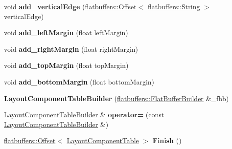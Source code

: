 \begin{DoxyCompactItemize}
\item 
\mbox{\label{structflatbuffers_1_1LayoutComponentTableBuilder_aa7a709b341f4b4b62d538a2db9bcde43}} 
void {\bfseries add\+\_\+vertical\+Edge} (\hyperlink{structflatbuffers_1_1Offset}{flatbuffers\+::\+Offset}$<$ \hyperlink{structflatbuffers_1_1String}{flatbuffers\+::\+String} $>$ vertical\+Edge)
\item 
\mbox{\label{structflatbuffers_1_1LayoutComponentTableBuilder_a2d6a674e3edb4f2c7b7a426f628aaeff}} 
void {\bfseries add\+\_\+left\+Margin} (float left\+Margin)
\item 
\mbox{\label{structflatbuffers_1_1LayoutComponentTableBuilder_a62758a856c7dd7093684ffbcec7f7d15}} 
void {\bfseries add\+\_\+right\+Margin} (float right\+Margin)
\item 
\mbox{\label{structflatbuffers_1_1LayoutComponentTableBuilder_afde69f207294bf7b0b4097c6f31f0304}} 
void {\bfseries add\+\_\+top\+Margin} (float top\+Margin)
\item 
\mbox{\label{structflatbuffers_1_1LayoutComponentTableBuilder_a68f4715e0f01f6d6e89542fece156944}} 
void {\bfseries add\+\_\+bottom\+Margin} (float bottom\+Margin)
\item 
\mbox{\label{structflatbuffers_1_1LayoutComponentTableBuilder_a82291d1cf3f7abb3f6832b71db237f32}} 
{\bfseries Layout\+Component\+Table\+Builder} (\hyperlink{classflatbuffers_1_1FlatBufferBuilder}{flatbuffers\+::\+Flat\+Buffer\+Builder} \&\+\_\+fbb)
\item 
\mbox{\label{structflatbuffers_1_1LayoutComponentTableBuilder_a056eceed3a0266014c35743d82b5a8ff}} 
\hyperlink{structflatbuffers_1_1LayoutComponentTableBuilder}{Layout\+Component\+Table\+Builder} \& {\bfseries operator=} (const \hyperlink{structflatbuffers_1_1LayoutComponentTableBuilder}{Layout\+Component\+Table\+Builder} \&)
\item 
\mbox{\label{structflatbuffers_1_1LayoutComponentTableBuilder_adf182f3a5cbf8bed5b28be79144dc420}} 
\hyperlink{structflatbuffers_1_1Offset}{flatbuffers\+::\+Offset}$<$ \hyperlink{structflatbuffers_1_1LayoutComponentTable}{Layout\+Component\+Table} $>$ {\bfseries Finish} ()
\end{DoxyCompactItemize}
